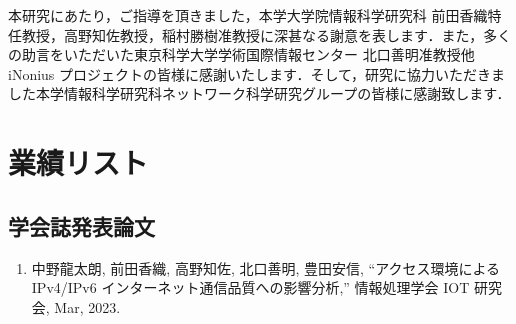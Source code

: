 \documentclass[12pt]{mthesis_utf8}
\begin{document}



\begin{acknowledgment}
本研究にあたり，ご指導を頂きました，本学大学院情報科学研究科 前田香織特任教授，高野知佐教授，稲村勝樹准教授に深甚なる謝意を表します．また，多くの助言をいただいた東京科学大学学術国際情報センター 北口善明准教授他 iNonius プロジェクトの皆様に感謝いたします．そして，研究に協力いただきました本学情報科学研究科ネットワーク科学研究グループの皆様に感謝致します．

\end{acknowledgment}



\chapter*{業績リスト}

\section*{学会誌発表論文}
\begin{enumerate}
%
\item 中野龍太朗, 前田香織, 高野知佐, 北口善明, 豊田安信, “アクセス環境による IPv4/IPv6 インターネット通信品質への影響分析,” 情報処理学会 IOT 研究会, Mar, 2023.
\end{enumerate}
%
\end{document}
